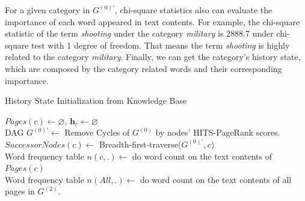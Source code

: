 \documentclass{article}
\begin{document}
For a given category in \(G^{(0)'}\), chi-square statistics also can evaluate the importance of each word appeared in text contents. 
For example, the chi-square statistic of the term \textit{shooting} under the category \textit{military} is 2888.7 under chi-square test with 1 degree of freedom.
That means the term \textit{shooting} is highly related to the category \textit{military}.  
Finally, we can get the category's history state, which are  composed by the category related words and their corresponding importance.
\begin{algorithm}[h]
\scriptsize
\caption{History State Initialization from Knowledge Base}
\label{alg:normalStatesInit}

\(Pages(c)\leftarrow \varnothing\), \(\bm{h}_c \leftarrow \varnothing\)\\
DAG \(G^{(0)'} \leftarrow\) Remove Cycles of \(G^{(0)}\) by nodes' HITS-PageRank scores. \label{alg:line2inNormalStatesInit}\\
\(SuccessorNodes(c) \leftarrow \) Breadth-first-traverse(\(G^{(0)'},c\))\label{alg:line3inNormalStatesInit}\\
Word frequency table \(n(c,.) \leftarrow \) do word count on the text contents of \(Pages(c)\) \\
Word frequency table \(n(All,.) \leftarrow \) do word count on the text contents of all pages in \(G^{(2)}\).\\
\end{algorithm}
\end{document}

